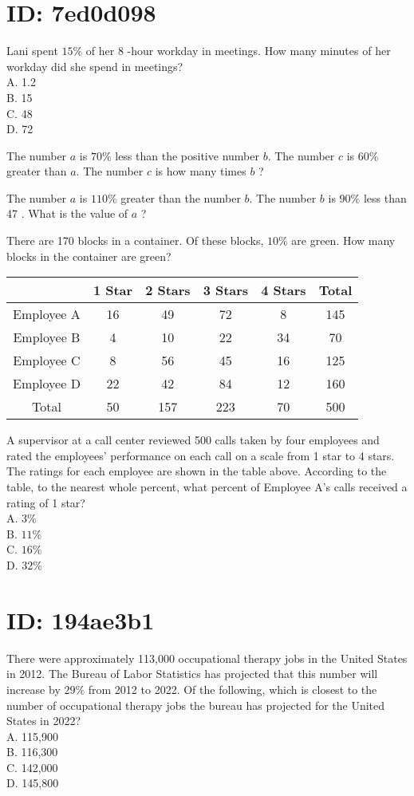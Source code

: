 \section*{ID: 7ed0d098}
Lani spent $15 \%$ of her 8 -hour workday in meetings. How many minutes of her workday did she spend in meetings?\\
A. 1.2\\
B. 15\\
C. 48\\
D. 72

The number $a$ is $70 \%$ less than the positive number $b$. The number $c$ is $60 \%$ greater than $a$. The number $c$ is how many times $b$ ?

The number $a$ is $110 \%$ greater than the number $b$. The number $b$ is $90 \%$ less than 47 . What is the value of $a$ ?

There are 170 blocks in a container. Of these blocks, $10 \%$ are green. How many blocks in the container are green?

\begin{center}
\begin{tabular}{|c|c|c|c|c|c|}
\hline
 & 1 Star & 2 Stars & 3 Stars & 4 Stars & Total \\
\hline
Employee A & 16 & 49 & 72 & 8 & 145 \\
\hline
Employee B & 4 & 10 & 22 & 34 & 70 \\
\hline
Employee C & 8 & 56 & 45 & 16 & 125 \\
\hline
Employee D & 22 & 42 & 84 & 12 & 160 \\
\hline
Total & 50 & 157 & 223 & 70 & 500 \\
\hline
\end{tabular}
\end{center}

A supervisor at a call center reviewed 500 calls taken by four employees and rated the employees' performance on each call on a scale from 1 star to 4 stars. The ratings for each employee are shown in the table above. According to the table, to the nearest whole percent, what percent of Employee A's calls received a rating of 1 star?\\
A. $3 \%$\\
B. $11 \%$\\
C. $16 \%$\\
D. $32 \%$

\section*{ID: 194ae3b1}
There were approximately 113,000 occupational therapy jobs in the United States in 2012. The Bureau of Labor Statistics has projected that this number will increase by $29 \%$ from 2012 to 2022. Of the following, which is closest to the number of occupational therapy jobs the bureau has projected for the United States in 2022?\\
A. 115,900\\
B. 116,300\\
C. 142,000\\
D. 145,800

